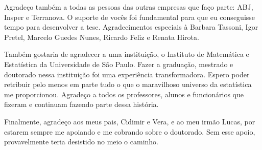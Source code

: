 \documentclass[12pt,twoside,brazilian]{book}
\begin{document}
Agradeço também a todas as pessoas das outras empresas que faço parte: ABJ, Insper e Terranova. O suporte de vocês foi fundamental para que eu conseguisse tempo para desenvolver a tese. Agradecimentos especiais à Barbara Tassoni, Igor Pretel, Marcelo Guedes Nunes, Ricardo Feliz e Renata Hirota.

Também gostaria de agradecer a uma instituição, o Instituto de Matemática e Estatística da Universidade de São Paulo. Fazer a graduação, mestrado e doutorado nessa instituição foi uma experiência transformadora. Espero poder retribuir pelo menos em parte tudo o que o maravilhoso universo da estatística me proporcionou. Agradeço a todos os professores, alunos e funcionários que fizeram e continuam fazendo parte dessa história.

Finalmente, agradeço aos meus pais, Cidimir e Vera, e ao meu irmão Lucas, por estarem sempre me apoiando e me cobrando sobre o doutorado. Sem esse apoio, provavelmente teria desistido no meio o caminho.

% 




\end{document}
